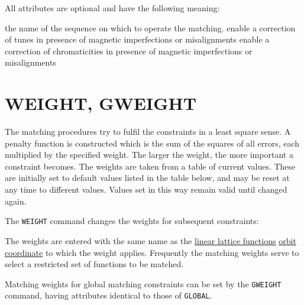 All attributes are optional and have the following meaning:
\begin{madlist}
   the name of the sequence on which to operate the matching.
   enable a correction of tunes in presence of
  magnetic imperfections or misalignments
  enable a correction of chromaticities in presence of
  magnetic imperfections or misalignments
\end{madlist}


\section{WEIGHT, GWEIGHT}
\label{sec:weight}\label{sec:gweight}

The matching procedures try to fulfil the constraints
in a least square sense.
A penalty function is constructed which is the sum of the
squares of all errors, each multiplied by the specified weight.
The larger the weight, the more important a constraint becomes.
The weights are taken from a table of current values.
These are initially set to default values listed in the table below,
and may be reset at any time to different values.
Values set in this way remain valid until changed again.

The {\tt WEIGHT} command changes the weights for subsequent
constraints: 

The weights are entered with the same name as the
\href{../Introduction/tables.html#linear}{linear lattice functions}
\href{../Introduction/closed_orbit.html}{orbit coordinate} 
to which the weight applies.
Frequently the matching weights serve to select a restricted
set of functions to be matched.


Matching weights for global matching constraints can be set by the 
{\tt GWEIGHT} command, having attributes identical to those of
{\tt GLOBAL}.

